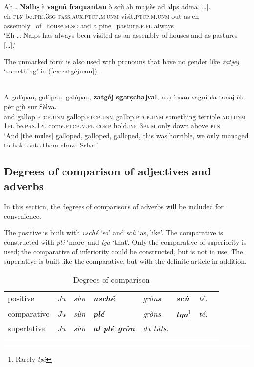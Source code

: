 \ea\label{ex:ptcp.unm1}
\\
\gll  Ah… \textbf{Nalbṣ} è \textbf{vagnú} \textbf{fraquantau} ò scù ah majṣès ad alps adina […].  \\
eh \textsc{pln} be.\textsc{prs.3sg} \textsc{pass.aux.ptcp.m.unm} visit.\textsc{ptcp.m.unm} out as eh assembly\_of\_house.\textsc{m.sg} and alpine\_pasture.\textsc{f.pl} always\\
\glt `Eh … Nalps has always been visited as an assembly of houses and as pastures […].'
\z

The unmarked form is also used with pronouns that have no gender like \textit{zatgéj} `something' in (\ref{ex:zatgéjunm}).


\ea\label{ex:zatgéjunm}
\\
\gll  A galòpau, galòpau, galòpau, \textbf{zatgéj} \textbf{sgarṣchajval}, nuṣ èssan vagní da tanaj èls pér gjù ṣur Sèlva.  \\ 
and gallop.\textsc{ptcp.unm} gallop.\textsc{ptcp.unm} gallop.\textsc{ptcp.unm} something terrible.\textsc{adj.unm} \textsc{1pl} be.\textsc{prs.1pl} come.\textsc{ptcp.m.pl}   \textsc{comp} hold.\textsc{inf} \textsc{3pl.m} only down above \textsc{pln}  \\
\glt `And [the mules] galloped, galloped, galloped, this was horrible, we only managed to hold onto them above Selva.'
\z

\subsection{Degrees of comparison of adjectives and adverbs}
In this section, the degrees of comparisons of adverbs will be included for convenience.

The positive is built with \textit{usché} `so' and \textit{scù} `as, like'. The comparative is constructed with \textit{plé} `more' and \textit{tga} `that'. Only the comparative of superiority is used; the comparative of inferiority could be constructed, but is not in use. The superlative is built like the comparative, but with the definite article in addition.

\begin{table}
	\caption{Degrees of comparison}
	\label{}
\begin{tabular}{llllllll}
	\lsptoprule
	positive & \textit{Ju} & \textit{sùn} & \textbf{\textit{usché}} & \textit{gròns} & \textbf{\textit{scù}} & \textit{té}.\\
comparative & \textit{Ju} & \textit{sùn} & \textbf{\textit{plé}} & \textit{\textit{gròns}} & \textit{\textbf{tga}}\footnote{Rarely \textit{tgé}} & \textit{té}.\\
superlative & \textit{Ju} & \textit{sùn} & \textbf{\textit{al plé gròn}} & \textit{da tùts}.\\
	\lspbottomrule
\end{tabular}
\end{table}

